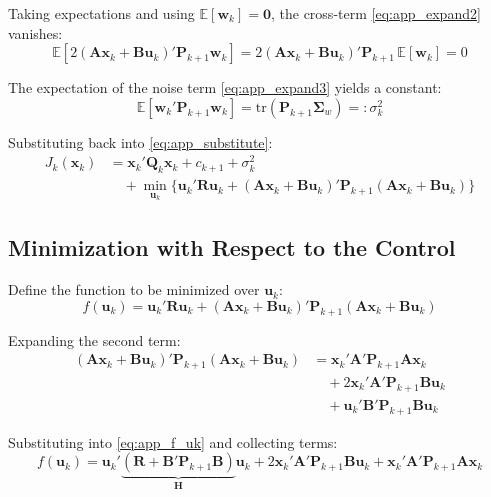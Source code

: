 \documentclass[12pt, a4paper]{article}
\begin{document}
Taking expectations and using $\mathbb{E}[\bm{w}_k] = \bm{0}$, the 
cross-term \eqref{eq:app_expand2} vanishes:
\begin{equation}
    \mathbb{E}\left[ 2(\bm{A}\bm{x}_k + \bm{B}\bm{u}_k)' 
    \bm{P}_{k+1} \bm{w}_k \right] = 2(\bm{A}\bm{x}_k + 
    \bm{B}\bm{u}_k)' \bm{P}_{k+1} \, \mathbb{E}[\bm{w}_k] = 0
    \label{eq:app_crossterm}
\end{equation}

The expectation of the noise term \eqref{eq:app_expand3} yields a 
constant:
\begin{equation}
    \mathbb{E}[\bm{w}_k' \bm{P}_{k+1} \bm{w}_k] = 
    \text{tr}(\bm{P}_{k+1} \bm{\Sigma}_w) =: \sigma_k^2
    \label{eq:app_noiseterm}
\end{equation}

Substituting back into \eqref{eq:app_substitute}:
\begin{align}
    J_k(\bm{x}_k) &= \bm{x}_k' \bm{Q}_k \bm{x}_k + c_{k+1} + 
    \sigma_k^2 \nonumber \\
    &\quad + \min_{\bm{u}_k} \Big\{ \bm{u}_k' \bm{R} \bm{u}_k + 
    (\bm{A}\bm{x}_k + \bm{B}\bm{u}_k)' \bm{P}_{k+1} 
    (\bm{A}\bm{x}_k + \bm{B}\bm{u}_k) \Big\}
    \label{eq:app_Jk_simplified}
\end{align}

\subsection{Minimization with Respect to the Control}

Define the function to be minimized over $\bm{u}_k$:
\begin{equation}
    f(\bm{u}_k) = \bm{u}_k' \bm{R} \bm{u}_k + 
    (\bm{A}\bm{x}_k + \bm{B}\bm{u}_k)' \bm{P}_{k+1} 
    (\bm{A}\bm{x}_k + \bm{B}\bm{u}_k)
    \label{eq:app_f_uk}
\end{equation}

Expanding the second term:
\begin{align}
    (\bm{A}\bm{x}_k + \bm{B}\bm{u}_k)' \bm{P}_{k+1} 
    (\bm{A}\bm{x}_k + \bm{B}\bm{u}_k) 
    &= \bm{x}_k' \bm{A}' \bm{P}_{k+1} \bm{A} \bm{x}_k \nonumber \\
    &\quad + 2 \bm{x}_k' \bm{A}' \bm{P}_{k+1} \bm{B} \bm{u}_k 
    \nonumber \\
    &\quad + \bm{u}_k' \bm{B}' \bm{P}_{k+1} \bm{B} \bm{u}_k
    \label{eq:app_expand_quad}
\end{align}

Substituting into \eqref{eq:app_f_uk} and collecting terms:
\begin{equation}
    f(\bm{u}_k) = \bm{u}_k' \underbrace{(\bm{R} + \bm{B}' 
    \bm{P}_{k+1} \bm{B})}_{\bm{H}} \bm{u}_k + 
    2 \bm{x}_k' \bm{A}' \bm{P}_{k+1} \bm{B} \bm{u}_k + 
    \bm{x}_k' \bm{A}' \bm{P}_{k+1} \bm{A} \bm{x}_k
    \label{eq:app_f_collected}
\end{equation}
\end{document}
